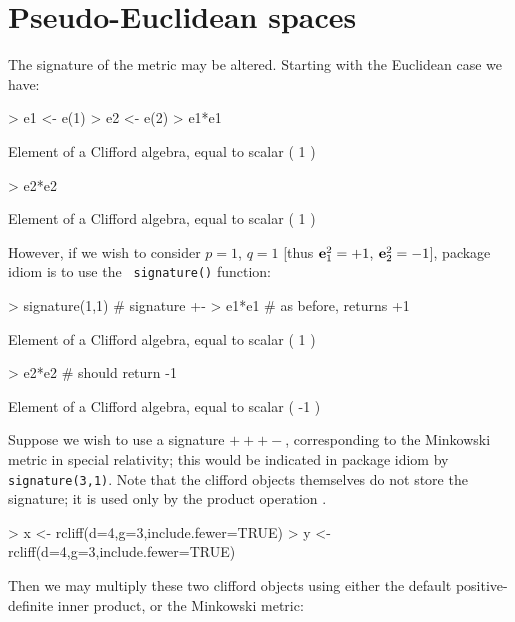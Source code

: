 \documentclass{birkjour}
\theoremstyle{definition}
\theoremstyle{remark}
\numberwithin{equation}{section}
\renewenvironment{Schunk}{\vspace{20pt}}{\vspace{20pt}}
\begin{document}
\section{Pseudo-Euclidean spaces}

The signature of the metric may be altered.  Starting with the
Euclidean case we have:
    
\begin{Schunk}
\begin{Sinput}
> e1 <- e(1)
> e2 <- e(2)
> e1*e1
\end{Sinput}
\begin{Soutput}
Element of a Clifford algebra, equal to
scalar ( 1 )
\end{Soutput}
\begin{Sinput}
> e2*e2
\end{Sinput}
\begin{Soutput}
Element of a Clifford algebra, equal to
scalar ( 1 )
\end{Soutput}
\end{Schunk}
%
However, if we wish to consider $p=1$, $q=1$ [thus
    ${\bf e}_{1}^2=+1$, ${\bf e}_{2}^2=-1$], package idiom is to use the {\tt
    signature()} function:

\begin{Schunk}
\begin{Sinput}
> signature(1,1)  # signature +-
> e1*e1 # as before, returns +1
\end{Sinput}
\begin{Soutput}
Element of a Clifford algebra, equal to
scalar ( 1 )
\end{Soutput}
\begin{Sinput}
> e2*e2 # should return -1
\end{Sinput}
\begin{Soutput}
Element of a Clifford algebra, equal to
scalar ( -1 )
\end{Soutput}
\end{Schunk}
%
Suppose we wish to use a signature $+++-$, corresponding to the
Minkowski metric in special relativity; this would be indicated in
package idiom by {\tt signature(3,1)}.  Note that the clifford objects
themselves do not store the signature; it is used only by the product
operation {\tt *}.

\begin{Schunk}
\begin{Sinput}
> x <- rcliff(d=4,g=3,include.fewer=TRUE)
> y <- rcliff(d=4,g=3,include.fewer=TRUE)
\end{Sinput}
\end{Schunk}
%
Then we may multiply these two clifford objects using either the
default positive-definite inner product, or the Minkowski metric:
\end{document}
